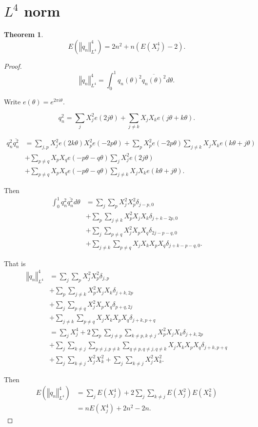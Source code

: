 \documentclass{article}
\newcommand{\norm}[1]{\left\Vert #1 \right\Vert}
\newtheorem{theorem}{Theorem}
\begin{document}
\section{$L^4$ norm}
\begin{theorem}
\[
E(\norm{q_n}_{L^4}^4) = 2n^2+ n(E(X_j^4)-2).
\]
\end{theorem}
\begin{proof}
\[
\norm{q_n}_{L^4}^4 = \int_0^{1} q_n(\theta)^2 \overline{q_n(\theta)^2} d\theta.
\]

Write $e(\theta)=e^{2\pi i\theta}$. 

\[
q_n^2 = \sum_j X_j^2 e(2j \theta) + \sum_{j \neq k} X_j X_k e(j\theta+k\theta).
\]

\begin{align*}
q_n^2 \overline{q_n^2}&=\sum_{j,p} X_j^2 e(2k\theta) X_p^2 e(-2p\theta)+\sum_p X_p^2 e(-2p\theta)
\sum_{j \neq k} X_j X_k e(k\theta+j\theta)\\
&+\sum_{p \neq q} X_p X_q e(-p\theta - q\theta) \sum_j X_j^2 e(2j\theta)\\
&+\sum_{p \neq q} X_p X_q e(-p\theta - q\theta) \sum_{j \neq k} X_j X_k e(k\theta+j\theta).
\end{align*}

Then
\begin{align*}
\int_0^1 q_n^2 \overline{q_n^2} d\theta&= \sum_j \sum_p X_j^2 X_p^2 \delta_{j-p,0}\\
&+\sum_p \sum_{j \neq k} X_p^2 X_j X_k \delta_{j+k-2p,0}\\
&+ \sum_j \sum_{p \neq q} X_j^2 X_p X_q \delta_{2j-p-q,0}\\
&+\sum_{j \neq k} \sum_{p \neq q} X_j X_k X_p X_q \delta_{j+k-p-q,0}.
\end{align*}

That is
\begin{align*}
\norm{q_n}_{L^4}^4&=\sum_j \sum_p X_j^2 X_p^2 \delta_{j,p}\\
&+\sum_p \sum_{j \neq k} X_p^2 X_j X_k \delta_{j+k,2p}\\
&+\sum_j \sum_{p \neq q} X_j^2 X_p X_q \delta_{p+q,2j}\\
&+\sum_{j \neq k} \sum_{p \neq q} X_j X_k X_p X_q \delta_{j+k,p+q}\\
&=\sum_j X_j^4 + 2 \sum_p \sum_{j \neq p} \sum_{k \neq p, k \neq j} X_p^2 X_j X_k \delta_{j+k,2p}\\
&+\sum_j \sum_{k \neq j} \sum_{p \neq j, p \neq k} \sum_{q \neq p, q \neq j, q \neq k} X_j X_k X_p X_q \delta_{j+k,p+q}\\
&+\sum_j \sum_{k \neq j} X_j^2 X_k^2 + \sum_j \sum_{k \neq j} X_j^2 X_k^2.
\end{align*}


Then
\begin{align*}
E(\norm{q_n}_{L^4}^4) &= \sum_j E(X_j^4) + 2\sum_j \sum_{k \neq j} E(X_j^2) E(X_k^2)\\
&=nE(X_j^4) + 2n^2 -2n.
\end{align*}
\end{proof}
\end{document}
